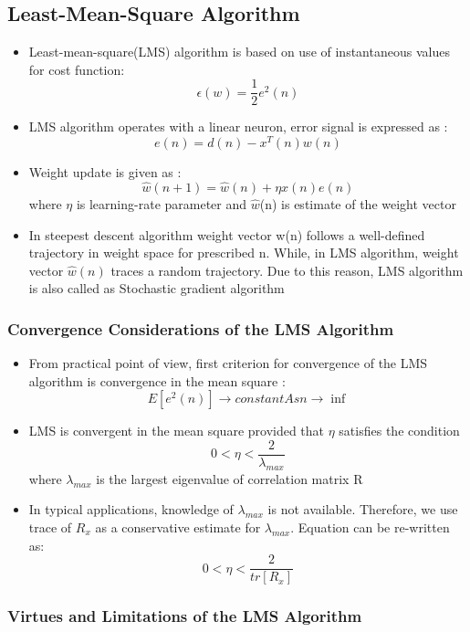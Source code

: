 \documentclass[12pt]{article}
\begin{document}
\subsection{Least-Mean-Square Algorithm}

\begin{itemize}
	\item Least-mean-square(LMS) algorithm is based on use of instantaneous values for cost function: $$ \epsilon(w) = \frac{1}{2} e^2(n) $$
	\item LMS algorithm operates with a linear neuron, error signal is expressed as : $$ e(n) = d(n) - x^T(n)w(n) $$
	\item Weight update is given as : $$ \hat{w}(n+1) = \hat{w}(n) + \eta x(n) e(n)$$ 
	where $\eta$ is learning-rate parameter and $\hat{w}$(n) is estimate of the weight vector
	\item In steepest descent algorithm weight vector w(n) follows a well-defined trajectory in weight space for prescribed n. While, in LMS algorithm, weight vector $\hat{w}(n)$ traces a random trajectory. Due to this reason, LMS algorithm is also called as Stochastic gradient algorithm 
\end{itemize}  

\subsubsection{Convergence Considerations of the LMS Algorithm}

\begin{itemize}
	\item From practical point of view, first criterion for convergence of the LMS algorithm is convergence in the mean square : \ 
	$$ E[e^2(n)]\longrightarrow constant As   n  \longrightarrow  \inf $$
	\item LMS is convergent in the mean square provided that $\eta$ satisfies the condition $$ 0 < \eta < \frac{2}{\lambda _ {max} }  $$ 
	where $\lambda_{max}$ is the largest eigenvalue of correlation matrix R
	\item In typical applications, knowledge of $\lambda_{max}$ is not available. Therefore, we use trace of $R_x$ as a conservative estimate for $\lambda_{max}$. Equation can be re-written as: $$ 0 < \eta < \frac{2}{tr[R_x] }  $$ 
\end{itemize}

\subsubsection{Virtues and Limitations of the LMS Algorithm}
\end{document}
